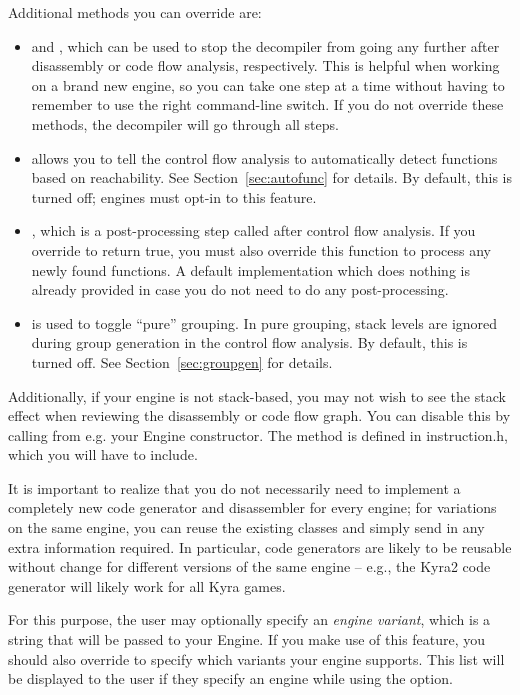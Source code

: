 Additional methods you can override are:
\begin{itemize}
\item {} and , which can be used to stop the decompiler from going any further after disassembly or code flow analysis, respectively. This is helpful when working on a brand new engine, so you can take one step at a time without having to remember to use the right command-line switch. If you do not override these methods, the decompiler will go through all steps.
\item {} allows you to tell the control flow analysis to automatically detect functions based on reachability. See Section~\vref{sec:autofunc} for details. By default, this is turned off; engines must opt-in to this feature.
\item {}, which is a post-processing step called after control flow analysis. If you override  to return true, you must also override this function to process any newly found functions. A default implementation which does nothing is already provided in case you do not need to do any post-processing.
\item {} is used to toggle ``pure'' grouping. In pure grouping, stack levels are ignored during group generation in the control flow analysis. By default, this is turned off. See Section~\vref{sec:groupgen} for details.
\end{itemize}

Additionally, if your engine is not stack-based, you may not wish to see the stack effect when reviewing the disassembly or code flow graph. You can disable this by calling  from e.g. your Engine constructor. The method is defined in instruction.h, which you will have to include.

It is important to realize that you do not necessarily need to implement a completely new code generator and disassembler for every engine; for variations on the same engine, you can reuse the existing classes and simply send in any extra information required. In particular, code generators are likely to be reusable without change for different versions of the same engine -- e.g., the Kyra2 code generator will likely work for all Kyra games.

For this purpose, the user may optionally specify an \emph{engine variant}, which is a string that will be passed to your Engine. If you make use of this feature, you should also override  to specify which variants your engine supports. This list will be displayed to the user if they specify an engine while using the  option.


